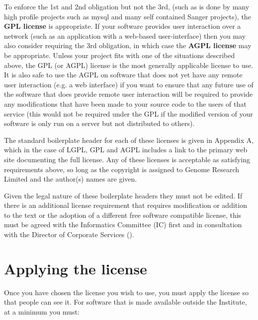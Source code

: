 \documentclass[10pt,a4paper]{article}
\begin{document}
To enforce the 1st and 2nd obligation but not the 3rd, (such as is done by many high 
profile projects such as mysql and many self contained Sanger projects), the \textbf{GPL 
license} is appropriate. If your software provides user interaction over a network (such 
as an application with a web-based user-interface) then you may also consider requiring 
the 3rd obligation, in which case the \textbf{AGPL license} may be appropriate. Unless your 
project fits with one of the situations described above, the GPL (or AGPL) license is the 
most generally applicable license to use. It is also safe to use the AGPL on software that 
does not yet have any remote user interaction (e.g. a web interface) if you want to 
ensure that any future use of the software that does provide remote user interaction will 
be required to provide any modifications that have been made to your source code to 
the users of that service (this would not be required under the GPL if the modified 
version of your software is only run on a server but not distributed to others). 
 
The standard boilerplate header for each of these licenses is given in Appendix A, 
which in the case of LGPL, GPL and AGPL includes a link to the primary web site 
documenting the full license. Any of these licenses is acceptable as satisfying 
requirements above, so long as the copyright is assigned to Genome Research Limited 
and the author(s) names are given.

Given the legal nature of these boilerplate headers they must not be edited. If there is an 
additional license requirement that requires modification or addition to the text or the 
adoption of a different free software compatible license, this must be agreed with the 
Informatics Committee (IC) first and in consultation with the Director of Corporate 
Services (\docsperson).


\section{Applying the license}

Once you have chosen the license you wish to use, you must apply the license so that 
people can see it. For software that is made available outside the Institute, at a 
minimum you must:
\end{document}
